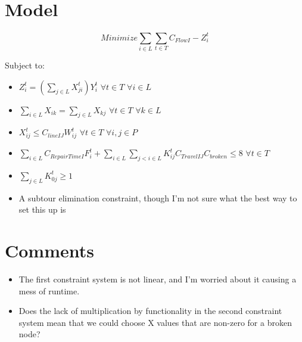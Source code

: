 \documentclass{article}
\begin{document}
	\section{Model}
	$$	Minimize \sum_{i \in L} \sum_{t \in T} C_{FlowI}-Z_{i}^t $$
	
	Subject to:
	\begin{itemize}
		\item $Z_i^t = (\sum_{j \in L} X_{ji}^t) Y_i^t \hspace{4pt} \forall t \in T \hspace{4pt} \forall i \in L$
		\item $\sum_{i \in L} X_{ik} = \sum_{j \in L} X_{kj} \hspace{4pt} \forall t \in T \hspace{4pt} \forall k \in L$ 
		\item $X_{ij}^t \leq C_{lineIJ}W_{ij}^t \hspace{4pt} \forall t \in T \hspace{4pt} \forall i,j \in P$
		\item $\sum_{i \in L} C_{RepairTimeI} F_{i}^t + \sum_{i \in L} \sum_{j<i \in L}  K_{ij}^t C_{TravelIJ} C_{broken} \leq 8 \hspace{4pt} \forall t \in T \hspace{4pt}$
		\item $\sum_{j \in L} K_{0j}^t \geq 1$
		\item A subtour elimination constraint, though I'm not sure what the best way to set this up is 
	\end{itemize}
	\section{Comments}
	\begin{itemize}
		\item The first constraint system is not linear, and I'm worried about it causing a mess of runtime.
		\item Does the lack of multiplication by functionality in the second constraint system mean that we could choose X values that are non-zero for a broken node?
	\end{itemize}
\end{document}
